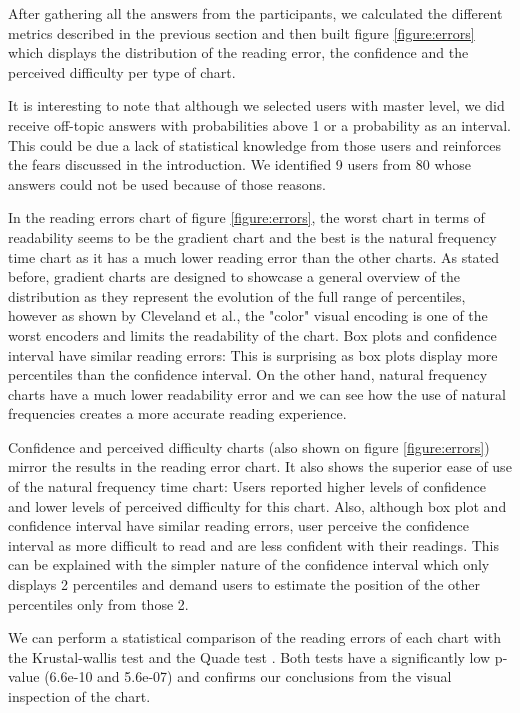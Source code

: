 \documentclass[a4paper,3p,sort&compress]{elsarticle}
\begin{document}
After gathering all the answers from the participants, we calculated the different metrics described in the previous section and 
then built figure \ref{figure:errors} 
which displays 
the distribution of the reading error, the confidence and the perceived difficulty per type of chart. 

It is interesting to note that although we selected users with master level, we did receive off-topic answers with probabilities 
above 1 or a probability as an interval. This could be due a lack of statistical knowledge from those 
users and reinforces the fears discussed in the introduction. We identified 9 users from 80 whose answers could not be used because of those reasons.

In the reading errors chart of figure \ref{figure:errors}, the worst chart in terms of readability seems to be the 
gradient chart and the best is the natural frequency time chart as it has a much lower reading error than the other charts. As stated before, 
gradient charts are designed to showcase a general overview of the distribution as they represent the evolution of the
full range of percentiles, however as shown by Cleveland et al., the "color" visual encoding is one of the 
worst encoders and limits the readability of the chart. Box plots and confidence interval have similar reading errors: This is surprising
as box plots display more percentiles than the confidence interval. On the other hand, natural 
frequency charts have a much lower readability error and we can see how the use of natural frequencies creates a more accurate reading experience.

Confidence and perceived difficulty charts (also shown on figure \ref{figure:errors}) mirror the results in the reading error chart.
It also shows the superior ease of use 
of the natural frequency time chart: Users reported higher levels of confidence and 
lower levels of perceived difficulty for this chart. Also, although box plot and confidence interval have similar reading errors,
user perceive the confidence interval as more difficult to read and are less confident with their readings. This can be explained with 
the simpler nature of the confidence interval which only displays 2 percentiles and demand users to estimate the position of the other 
percentiles only from those 2.

We can perform a statistical comparison of the reading errors of each chart with the Krustal-wallis test \cite{krustal} and 
the Quade test \cite{quade_rank_1967}. Both tests have a 
significantly low p-value (6.6e-10 and 5.6e-07) and confirms our conclusions from the visual inspection of the chart.
\end{document}
